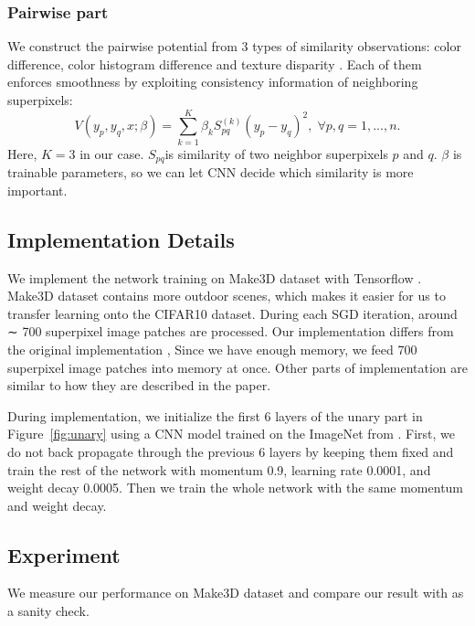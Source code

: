 \documentclass[journal]{IEEEtran}
\begin{document}
\subsubsection{Pairwise part}
We construct the pairwise potential from 3 types of similarity observations: 
color difference, color histogram difference and texture 
disparity \cite{ojala1994performance}. Each of them enforces smoothness by 
exploiting consistency information of neighboring superpixels:
\begin{equation}
\label{eq:pairwise}
V(y_{p}, y_{q}, x; \beta) = \sum_{k=1}^K \beta_k S_{pq}^{(k)}(y_p - y_q)^2, 
\;\forall p,q=1,...,n.
\end{equation}
Here, $K=3$ in our case. $S_{pq}$is similarity of two neighbor superpixels $p$ 
and $q$. $\beta$ is trainable parameters, so we can let CNN decide which 
similarity is more important. 

\subsection{Implementation Details}
We implement the network training on Make3D \cite{saxena2005learning} dataset 
with Tensorflow \cite{tensorflow2015-whitepaper}. Make3D dataset contains 
more outdoor scenes, which makes it easier for us to transfer learning onto the
CIFAR10 dataset. During each SGD iteration, 
around ∼ 700 superpixel image patches are processed. Our implementation differs from the 
original implementation \cite{liu2015deep}, Since we have enough memory, we feed 
700 superpixel image patches into memory at once. Other parts of implementation are similar to how they are described in the paper.

During implementation, we initialize the first 6 layers of the unary part in 
Figure~\ref{fig:unary} using a CNN model trained on the ImageNet 
from \cite{chatfield2014return}. First, we do not back propagate through the 
previous 6 layers by keeping them fixed and train the rest of the network
with momentum 0.9, learning rate 0.0001, and weight decay 
0.0005. Then we train the whole network with the same momentum and weight decay.

\subsection{Experiment}
We measure our performance on Make3D dataset and compare our result with \cite{liu2015deep} as a sanity check. 
\end{document}
